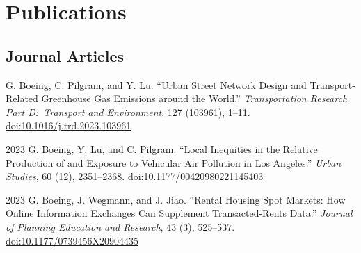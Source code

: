 \documentclass[11pt,letterpaper]{report}
\begin{document}
    \section*{Publications}

    \subsection*{Journal Articles}

    \begin{tablist}




        \item[\the\year] \tab{}G. Boeing, C. Pilgram, and Y. Lu. \enquote{Urban Street Network Design and Transport-Related Greenhouse Gas Emissions around the World.} \textit{Transportation Research Part D:\ Transport and Environment}, 127 (103961), 1--11. \href{https://doi.org/10.1016/j.trd.2023.103961}{doi:10.1016/j.trd.2023.103961}

        \item[2023] \tab{}G. Boeing, Y. Lu, and C. Pilgram. \enquote{Local Inequities in the Relative Production of and Exposure to Vehicular Air Pollution in Los Angeles.} \textit{Urban Studies}, 60 (12), 2351--2368. \href{https://doi.org/10.1177/00420980221145403}{doi:10.1177/00420980221145403}

        \item[2023] \tab{}G. Boeing, J. Wegmann, and J. Jiao. \enquote{Rental Housing Spot Markets: How Online Information Exchanges Can Supplement Transacted-Rents Data.} \textit{Journal of Planning Education and Research}, 43 (3), 525--537. \href{https://doi.org/10.1177/0739456X20904435}{doi:10.1177/0739456X20904435}


\end{tablist}
\end{document}
